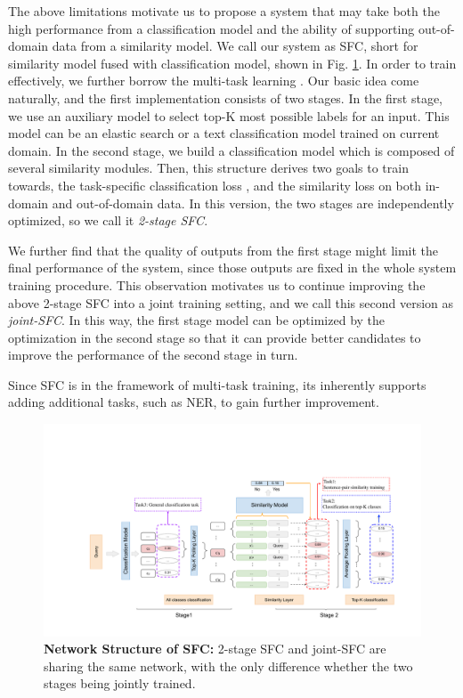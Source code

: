 The above limitations motivate us to propose a system that may take both the high performance from a classification model and the ability of supporting out-of-domain data from a similarity model.
We call our system as SFC, short for similarity model fused with classification model, shown in Fig. \ref{fig:framework}. 
In order to train effectively, we further borrow the multi-task learning \cite{caruana1993multitask,collobert2008unified, liu2019multi}.
Our basic idea come naturally, and the first implementation consists of two stages. 
In the first stage, we use an auxiliary model to select top-K most possible labels for an input. 
This model can be an elastic search \cite{divya2013elasticsearch} or a text classification model trained on current domain. 
In the second stage, we build a classification model which is composed of several similarity modules. 
Then, this structure derives two goals to train towards, the task-specific classification loss , and the similarity loss on both in-domain and out-of-domain data. 
In this version, the two stages are independently optimized, so we call it \emph{2-stage SFC}. 

We further find that the quality of outputs from the first stage might limit the final performance of the system, since those outputs are fixed in the whole system training procedure. 
This observation motivates us to continue improving the above 2-stage SFC into a joint training setting, and we call this second version as \emph{joint-SFC}. 
In this way, the first stage model can be optimized by the optimization in the second stage so that it can provide better candidates to improve the performance of the second stage in turn.

Since SFC is in the framework of multi-task training, its inherently supports adding additional tasks, such as NER, to gain further improvement.

\begin{figure}[t]
  \begin{centering}
    \includegraphics[scale=0.66]{picture/picture4} 
    \par
  \end{centering}
  \caption{
    \textbf{Network Structure of SFC:} 2-stage SFC and joint-SFC are sharing the same network, with the only difference whether the two stages being jointly trained.
  }
  \label{fig:framework}
\end{figure}

